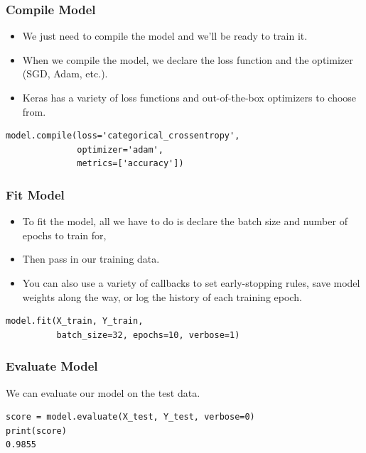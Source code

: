 \begin{frame}[fragile] \frametitle{Compile Model}

\begin{itemize}
\item We just need to compile the model and we'll be ready to train it. 
\item When we compile the model, we declare the loss function and the optimizer (SGD, Adam, etc.).
\item Keras has a variety of loss functions and out-of-the-box optimizers to choose from.
\end{itemize}
\begin{lstlisting}
model.compile(loss='categorical_crossentropy',
              optimizer='adam',
              metrics=['accuracy'])
\end{lstlisting}
\end{frame}

\begin{frame}[fragile] \frametitle{Fit Model}

\begin{itemize}
\item To fit the model, all we have to do is declare the batch size and number of epochs to train for,
\item Then pass in our training data.
\item You can also use a variety of callbacks to set early-stopping rules, save model weights along the way, or log the history of each training epoch.
\end{itemize}
\begin{lstlisting}
model.fit(X_train, Y_train,
          batch_size=32, epochs=10, verbose=1)
\end{lstlisting}
\end{frame}

\begin{frame}[fragile] \frametitle{Evaluate Model}
We can evaluate our model on the test data.
\begin{lstlisting}
score = model.evaluate(X_test, Y_test, verbose=0)
print(score)
0.9855
\end{lstlisting}

\end{frame}



    
